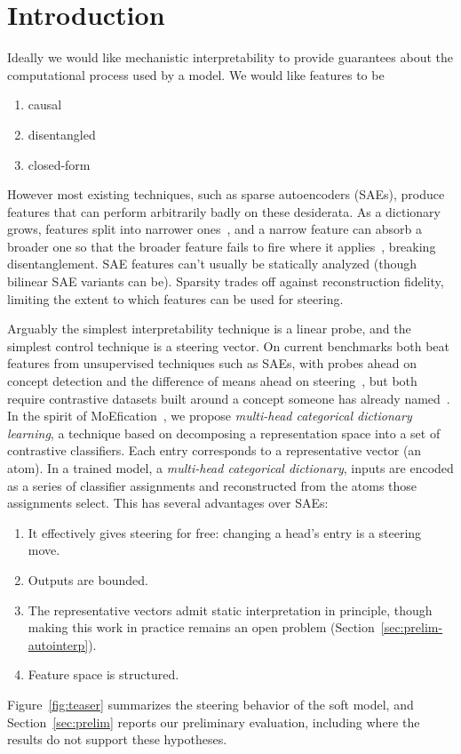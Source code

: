 \section{Introduction}

Ideally we would like mechanistic interpretability to provide guarantees
about the computational process used by a model. We would like features
to be
\begin{enumerate}
	\item causal
	\item disentangled
	\item closed-form
\end{enumerate}
However most existing techniques, such as sparse autoencoders (SAEs),
produce features that can perform arbitrarily badly on these desiderata.
As a dictionary grows, features split into narrower
ones~\cite{bricken2023}, and a narrow feature can absorb a broader one
so that the broader feature fails to fire where it
applies~\cite{chanin2025}, breaking disentanglement. SAE features can't
usually be statically analyzed (though bilinear SAE variants can be).
Sparsity trades off against reconstruction fidelity, limiting the extent
to which features can be used for steering.

Arguably the simplest interpretability technique is a linear probe, and
the simplest control technique is a steering vector. On current
benchmarks both beat features from unsupervised techniques such as SAEs,
with probes ahead on concept detection and the difference of means ahead
on steering~\cite{wu2025axbenchsteeringllmssimple}, but both require
contrastive datasets built around a concept someone has already
named~\cite{burns2023ccs}. In the spirit of MoEfication~\cite{zhang2022}, we
propose \emph{multi-head categorical dictionary learning}, a technique
based on decomposing a representation space into a set of contrastive
classifiers. Each entry corresponds to a representative vector (an
atom). In a trained model, a \emph{multi-head categorical dictionary},
inputs are encoded as a series of classifier assignments and
reconstructed from the atoms those assignments select. This has several
advantages over SAEs:
\begin{enumerate}
	\item It effectively gives steering for free: changing a
	head's entry is a steering move.
	\item Outputs are bounded.
	\item The representative vectors admit static interpretation in
	principle, though making this work in practice remains an open
	problem (Section~\ref{sec:prelim-autointerp}).
	\item Feature space is structured.
\end{enumerate}
Figure~\ref{fig:teaser} summarizes the steering behavior of the soft
model, and Section~\ref{sec:prelim} reports our preliminary evaluation,
including where the results do not support these hypotheses.

